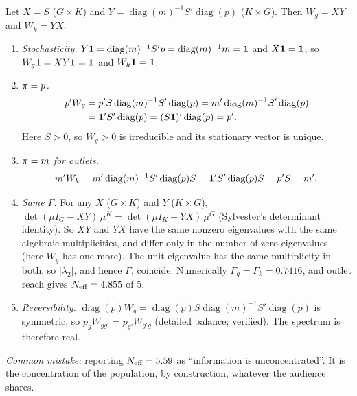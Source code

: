 \documentclass[../solutions_manual.tex]{subfiles}
\begin{document}
 Let $X = S$ ($G\times K$) and $Y = \operatorname{diag}(m)^{-1}S'\operatorname{diag}(p)$ ($K\times G$). Then $W_g = XY$ and $W_k = YX$.
\begin{enumerate}
\item \emph{Stochasticity.} $Y\mathbf{1} = \operatorname{diag}(m)^{-1}S'p = \operatorname{diag}(m)^{-1}m = \mathbf{1}$ and $X\mathbf{1} = \mathbf{1}$, so $W_g\mathbf{1} = XY\mathbf{1} = \mathbf{1}$ and $W_k\mathbf{1} = \mathbf{1}$.
\item \emph{$\pi = p$.}
\begin{align*}
p'W_g &= p'S\operatorname{diag}(m)^{-1}S'\operatorname{diag}(p) = m'\operatorname{diag}(m)^{-1}S'\operatorname{diag}(p)\\
&= \mathbf{1}'S'\operatorname{diag}(p) = (S\mathbf{1})'\operatorname{diag}(p) = p'.
\end{align*} Here $S > 0$, so $W_g > 0$ is irreducible and its stationary vector is unique.
\item \emph{$\pi = m$ for outlets.}
\[
m'W_k = m'\operatorname{diag}(m)^{-1}S'\operatorname{diag}(p)S = \mathbf{1}'S'\operatorname{diag}(p)S = p'S = m'.
\]
\item \emph{Same $\Gamma$.} For any $X$ ($G\times K$) and $Y$ ($K\times G$), $\det(\mu I_G - XY)\,\mu^{K} = \det(\mu I_K - YX)\,\mu^{G}$ (Sylvester's determinant identity). So $XY$ and $YX$ have the same nonzero eigenvalues with the same algebraic multiplicities, and differ only in the number of zero eigenvalues (here $W_g$ has one more). The unit eigenvalue has the same multiplicity in both, so $|\lambda_2|$, and hence $\Gamma$, coincide. Numerically $\Gamma_g = \Gamma_k = 0.7416$, and outlet reach gives $N_{\text{eff}} = 4.855$ of 5.
\item \emph{Reversibility.} $\operatorname{diag}(p)W_g = \operatorname{diag}(p)S\operatorname{diag}(m)^{-1}S'\operatorname{diag}(p)$ is symmetric, so $p_gW_{gg'} = p_{g'}W_{g'g}$ (detailed balance; verified). The spectrum is therefore real.
\end{enumerate}
\emph{Common mistake:} reporting $N_{\text{eff}} = 5.59$ as ``information is unconcentrated''. It is the concentration of the population, by construction, whatever the audience shares.

\end{document}
